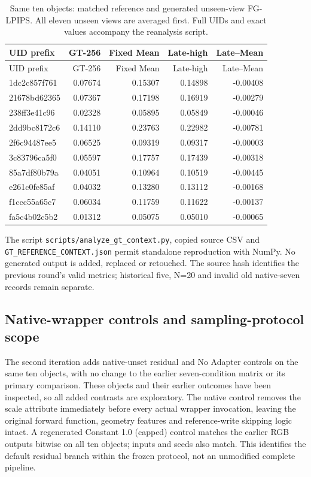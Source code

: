 \documentclass[11pt]{article}
\begin{document}
\begin{longtable}{lrrrr}
\caption{Same ten objects: matched reference and generated unseen-view FG-LPIPS. All eleven unseen views are averaged first. Full UIDs and exact values accompany the reanalysis script.}\\
\toprule UID prefix & GT-256 & Fixed Mean & Late-high & Late--Mean \\
\midrule\endfirsthead
\toprule UID prefix & GT-256 & Fixed Mean & Late-high & Late--Mean \\
\midrule\endhead
1dc2c857f761 & 0.07674 & 0.15307 & 0.14898 & -0.00408 \\
21678bd62365 & 0.07367 & 0.17198 & 0.16919 & -0.00279 \\
238ff3e41c96 & 0.02328 & 0.05895 & 0.05849 & -0.00046 \\
2dd9bc8172c6 & 0.14110 & 0.23763 & 0.22982 & -0.00781 \\
2f6c94487ee5 & 0.06525 & 0.09319 & 0.09317 & -0.00003 \\
3c83796ca5f0 & 0.05597 & 0.17757 & 0.17439 & -0.00318 \\
85a7df80b79a & 0.04051 & 0.10964 & 0.10519 & -0.00445 \\
e261c0fe85af & 0.04032 & 0.13280 & 0.13112 & -0.00168 \\
f1ccc55a65c7 & 0.06034 & 0.11759 & 0.11622 & -0.00137 \\
fa5c4b02c5b2 & 0.01312 & 0.05075 & 0.05010 & -0.00065 \\
\bottomrule\end{longtable}
The script \texttt{scripts/analyze\_gt\_context.py}, copied source CSV and \texttt{GT\_REFERENCE\_CONTEXT.json} permit standalone reproduction with NumPy. No generated output is added, replaced or retouched. The source hash identifies the previous round's valid metrics; historical five, N=20 and invalid old native-seven records remain separate.

\subsection*{Native-wrapper controls and sampling-protocol scope}
The second iteration adds native-unset residual and No Adapter controls on the same ten objects, with no change to the earlier seven-condition matrix or its primary comparison. These objects and their earlier outcomes have been inspected, so all added contrasts are exploratory. The native control removes the scale attribute immediately before every actual wrapper invocation, leaving the original forward function, geometry features and reference-write skipping logic intact. A regenerated Constant 1.0 (capped) control matches the earlier RGB outputs bitwise on all ten objects; inputs and seeds also match. This identifies the default residual branch within the frozen protocol, not an unmodified complete pipeline.
\end{document}

